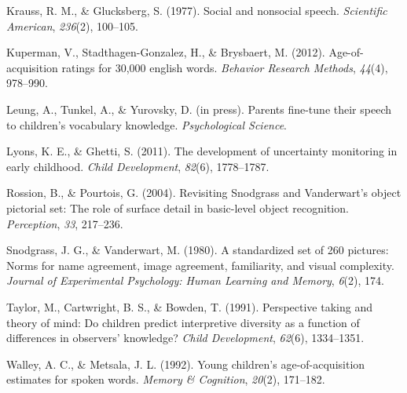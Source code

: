 \documentclass[10pt, letterpaper]{article}
\begin{document}
\leavevmode\hypertarget{ref-krauss1977}{}%
Krauss, R. M., \& Glucksberg, S. (1977). Social and nonsocial speech.
\emph{Scientific American}, \emph{236}(2), 100--105.

\leavevmode\hypertarget{ref-kuperman2012}{}%
Kuperman, V., Stadthagen-Gonzalez, H., \& Brysbaert, M. (2012).
Age-of-acquisition ratings for 30,000 english words. \emph{Behavior
Research Methods}, \emph{44}(4), 978--990.

\leavevmode\hypertarget{ref-leung2021}{}%
Leung, A., Tunkel, A., \& Yurovsky, D. (in press). Parents fine-tune
their speech to children's vocabulary knowledge. \emph{Psychological
Science}.

\leavevmode\hypertarget{ref-lyons2011}{}%
Lyons, K. E., \& Ghetti, S. (2011). The development of uncertainty
monitoring in early childhood. \emph{Child Development}, \emph{82}(6),
1778--1787.

\leavevmode\hypertarget{ref-rossion2004}{}%
Rossion, B., \& Pourtois, G. (2004). Revisiting Snodgrass and
Vanderwart's object pictorial set: The role of surface detail in
basic-level object recognition. \emph{Perception}, \emph{33}, 217--236.

\leavevmode\hypertarget{ref-snodgrass1980}{}%
Snodgrass, J. G., \& Vanderwart, M. (1980). A standardized set of 260
pictures: Norms for name agreement, image agreement, familiarity, and
visual complexity. \emph{Journal of Experimental Psychology: Human
Learning and Memory}, \emph{6}(2), 174.

\leavevmode\hypertarget{ref-taylor1991}{}%
Taylor, M., Cartwright, B. S., \& Bowden, T. (1991). Perspective taking
and theory of mind: Do children predict interpretive diversity as a
function of differences in observers' knowledge? \emph{Child
Development}, \emph{62}(6), 1334--1351.

\leavevmode\hypertarget{ref-walley1992}{}%
Walley, A. C., \& Metsala, J. L. (1992). Young children's
age-of-acquisition estimates for spoken words. \emph{Memory \&
Cognition}, \emph{20}(2), 171--182.


\end{document}
